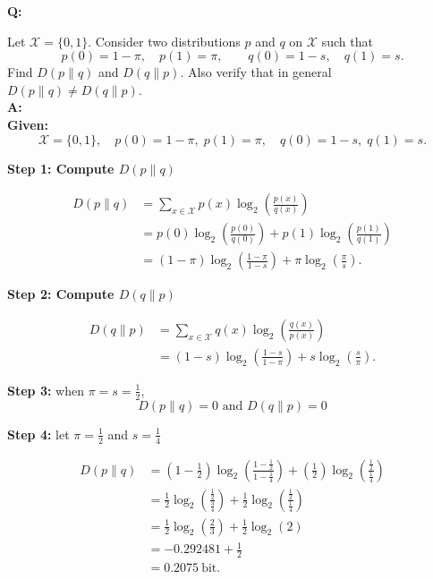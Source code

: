 \documentclass[11pt,a4paper]{book}
\newcounter{qna}[chapter]
\renewcommand{\theqna}{\thechapter.\arabic{qna}}
\newenvironment{questionanswerbox}{
    \refstepcounter{qna}%
    \begin{tcolorbox}[
        enhanced,
        breakable,
        colback=softlavender!10,
        colframe=softlavender!200,
        title={Example~\theqna}, %
        fonttitle=\bfseries,
        coltitle=white,
        colbacktitle=softlavender!200,
        sharp corners,
        boxrule=1pt,
        left=8pt,
        right=8pt,
        top=6pt,
        bottom=6pt
    ]
}{
    \end{tcolorbox}
}
\begin{document}
\begin{questionanswerbox}
\textbf{Q:}

Let \(\mathcal{X}=\{0,1\}\). Consider two distributions \(p\) and \(q\) on \(\mathcal{X}\) such that
\[
p(0)=1-\pi,\quad p(1)=\pi,
\qquad
q(0)=1-s,\quad q(1)=s.
\]
Find \(D(p\|q)\) and \(D(q\|p)\). Also verify that in general \(D(p\|q)\neq D(q\|p)\).
\medskip\\
\textbf{A:}
\medskip\\
\textbf{Given:}
\[
\mathcal{X}=\{0,1\},\quad
p(0)=1-\pi,\; p(1)=\pi,\quad
q(0)=1-s,\; q(1)=s.
\]

\textbf{Step 1: Compute \(D(p\|q)\)}

\begin{align*}
D(p\|q)
&=\sum_{x\in\mathcal{X}} p(x)\log_2\left(\frac{p(x)}{q(x)}\right)\\[6pt]
&=p(0)\log_2\left(\frac{p(0)}{q(0)}\right)+p(1)\log_2\left(\frac{p(1)}{q(1)}\right)\\[6pt]
&=(1-\pi)\log_2\left(\frac{1-\pi}{1-s}\right)+\pi\log_2\left(\frac{\pi}{s}\right).
\end{align*}

\textbf{Step 2: Compute \(D(q\|p)\)}

\begin{align*}
D(q\|p)
&=\sum_{x\in\mathcal{X}} q(x)\log_2\left(\frac{q(x)}{p(x)}\right)\\[6pt]
&=(1-s)\log_2\left(\frac{1-s}{1-\pi}\right)+s\log_2\left(\frac{s}{\pi}\right).
\end{align*}

\textbf{Step 3:} when \(\pi=s=\frac12\),
\[
D(p\|q)=0 \text{ and } D(q\|p)=0
\]

\textbf{Step 4:} let \(\pi=\frac12\) and \(s=\frac14\)

\begin{align*}
D(p\|q)
&=\left(1-\frac12\right)\log_2\left(\frac{1-\frac12}{1-\frac14}\right)
+\left(\frac12\right)\log_2\left(\frac{\frac12}{\frac14}\right)\\[6pt]
&=\frac12\log_2\left(\frac{\frac12}{\frac34}\right)
+\frac12\log_2\left(\frac{\frac12}{\frac14}\right)\\[6pt]
&=\frac12\log_2\left(\frac{2}{3}\right)+\frac12\log_2(2)\\[6pt]
&=-0.292481+\frac12\\[6pt]
&=0.2075\ \text{bit}.
\end{align*}


\end{questionanswerbox}
\end{document}
